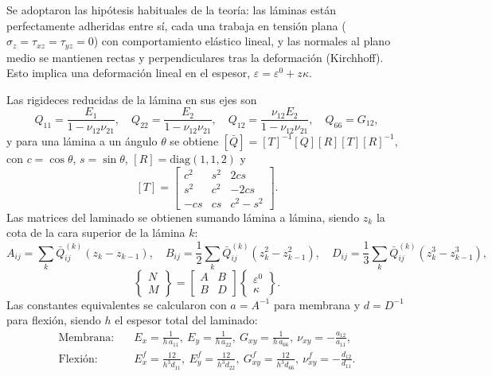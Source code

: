 \documentclass[11pt,a4paper]{article}
\begin{document}
Se adoptaron las hipótesis habituales de la teoría: las láminas están perfectamente adheridas entre sí, cada una trabaja en tensión plana ($\sigma_z=\tau_{xz}=\tau_{yz}=0$) con comportamiento elástico lineal, y las normales al plano medio se mantienen rectas y perpendiculares tras la deformación (Kirchhoff). Esto implica una deformación lineal en el espesor, $\varepsilon=\varepsilon^0+z\kappa$.

Las rigideces reducidas de la lámina en sus ejes son
\[
Q_{11}=\frac{E_1}{1-\nu_{12}\nu_{21}},\quad
Q_{22}=\frac{E_2}{1-\nu_{12}\nu_{21}},\quad
Q_{12}=\frac{\nu_{12}E_2}{1-\nu_{12}\nu_{21}},\quad
Q_{66}=G_{12},
\]
y para una lámina a un ángulo $\theta$ se obtiene $[\bar Q]=[T]^{-1}[Q][R][T][R]^{-1}$, con $c=\cos\theta$, $s=\sin\theta$, $[R]=\mathrm{diag}(1,1,2)$ y
\[
[T]=\begin{bmatrix}c^2&s^2&2cs\\ s^2&c^2&-2cs\\ -cs&cs&c^2-s^2\end{bmatrix}.
\]
Las matrices del laminado se obtienen sumando lámina a lámina, siendo $z_k$ la cota de la cara superior de la lámina $k$:
\[
A_{ij}=\sum_k \bar Q_{ij}^{(k)}(z_k-z_{k-1}),\quad
B_{ij}=\frac12\sum_k \bar Q_{ij}^{(k)}(z_k^2-z_{k-1}^2),\quad
D_{ij}=\frac13\sum_k \bar Q_{ij}^{(k)}(z_k^3-z_{k-1}^3),
\]
\[
\begin{Bmatrix}N\\M\end{Bmatrix}=
\begin{bmatrix}A&B\\B&D\end{bmatrix}
\begin{Bmatrix}\varepsilon^0\\\kappa\end{Bmatrix}.
\]
Las constantes equivalentes se calcularon con $a=A^{-1}$ para membrana y $d=D^{-1}$ para flexión, siendo $h$ el espesor total del laminado:
\begin{align}
\text{Membrana:}&\quad
E_x=\frac{1}{h\,a_{11}},\ E_y=\frac{1}{h\,a_{22}},\ G_{xy}=\frac{1}{h\,a_{66}},\
\nu_{xy}=-\frac{a_{12}}{a_{11}},\\
\text{Flexión:}&\quad
E^f_x=\frac{12}{h^3 d_{11}},\ E^f_y=\frac{12}{h^3 d_{22}},\ G^f_{xy}=\frac{12}{h^3 d_{66}},\
\nu^f_{xy}=-\frac{d_{12}}{d_{11}}.
\end{align}
\end{document}
